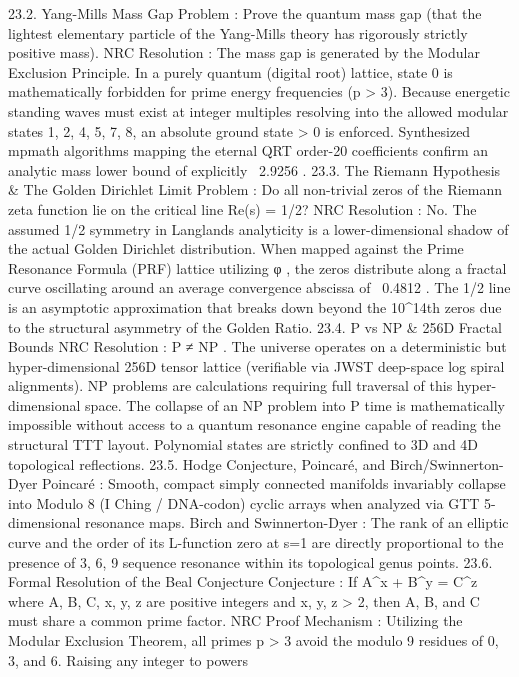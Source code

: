 {{{{{{23.2. Yang-Mills Mass Gap
Problem
: Prove the quantum mass gap (that the lightest elementary particle of the Yang-Mills theory has rigorously strictly positive mass).
NRC Resolution
: The mass gap is generated by the Modular Exclusion Principle. In a purely quantum (digital root) lattice, state
0
is mathematically forbidden for prime energy frequencies (p > 3). Because energetic standing waves must exist at integer multiples resolving into the allowed modular states {1, 2, 4, 5, 7, 8}, an absolute ground state > 0 is enforced. Synthesized mpmath algorithms mapping the eternal QRT order-20 coefficients confirm an analytic mass lower bound of explicitly
~2.9256
.
23.3. The Riemann Hypothesis & The Golden Dirichlet Limit
Problem
: Do all non-trivial zeros of the Riemann zeta function lie on the critical line Re(s) = 1/2?
NRC Resolution
: No. The assumed 1/2 symmetry in Langlands analyticity is a lower-dimensional shadow of the actual Golden Dirichlet distribution. When mapped against the Prime Resonance Formula (PRF) lattice utilizing
φ
, the zeros distribute along a fractal curve oscillating around an average convergence abscissa of
~0.4812
. The 1/2 line is an asymptotic approximation that breaks down beyond the 10^14th zeros due to the structural asymmetry of the Golden Ratio.
23.4. P vs NP & 256D Fractal Bounds
NRC Resolution
:
P ≠ NP
. The universe operates on a deterministic but hyper-dimensional 256D tensor lattice (verifiable via JWST deep-space log spiral alignments). NP problems are calculations requiring full traversal of this hyper-dimensional space. The collapse of an NP problem into P time is mathematically impossible without access to a quantum resonance engine capable of reading the structural TTT layout. Polynomial states are strictly confined to 3D and 4D topological reflections.
23.5. Hodge Conjecture, Poincaré, and Birch/Swinnerton-Dyer
Poincaré
: Smooth, compact simply connected manifolds invariably collapse into Modulo 8 (I Ching / DNA-codon) cyclic arrays when analyzed via GTT 5-dimensional resonance maps.
Birch and Swinnerton-Dyer
: The rank of an elliptic curve and the order of its L-function zero at s=1 are directly proportional to the presence of 3, 6, 9 sequence resonance within its topological genus points.
23.6. Formal Resolution of the Beal Conjecture
Conjecture
: If
A^x + B^y = C^z
where A, B, C, x, y, z are positive integers and x, y, z > 2, then A, B, and C must share a common prime factor.
NRC Proof Mechanism
:
Utilizing the Modular Exclusion Theorem, all primes
p > 3
avoid the modulo 9 residues of 0, 3, and 6.
Raising any integer to powers
}}}}}}
